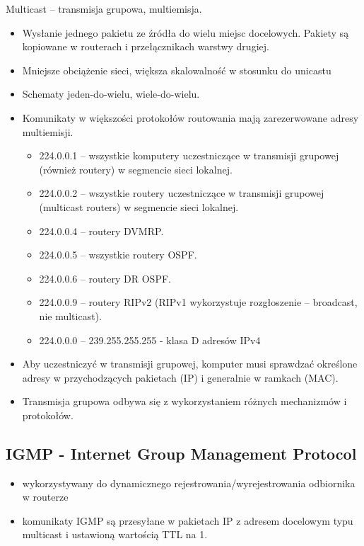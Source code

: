 \documentclass[../main.tex]{subfiles}
\begin{document}
    Multicast – transmisja grupowa, multiemisja.
    \begin{itemize}
        \item Wysłanie jednego pakietu ze źródła do wielu miejsc docelowych. Pakiety są kopiowane
        w routerach i przełącznikach warstwy drugiej.
        \item Mniejsze obciążenie
        sieci, większa skalowalność w stosunku do unicastu
        \item Schematy jeden-do-wielu, wiele-do-wielu.
        \item Komunikaty w większości protokołów routowania mają zarezerwowane adresy multiemisji.
        \begin{itemize}
            \item 224.0.0.1 – wszystkie komputery uczestniczące w transmisji grupowej (również routery) w
            segmencie sieci lokalnej.
            \item 224.0.0.2 – wszystkie routery uczestniczące w transmisji grupowej (multicast routers) w
            segmencie sieci lokalnej.
            \item 224.0.0.4 – routery DVMRP.
            \item 224.0.0.5 – wszystkie routery OSPF.
            \item 224.0.0.6 – routery DR OSPF.
            \item 224.0.0.9 – routery RIPv2 (RIPv1 wykorzystuje rozgłoszenie – broadcast, nie multicast).
            \item 224.0.0.0 – 239.255.255.255 - klasa D adresów IPv4
        \end{itemize}
        \item Aby uczestniczyć w transmisji grupowej, komputer musi sprawdzać określone adresy w
        przychodzących pakietach (IP) i generalnie w ramkach (MAC).
        \item Transmisja grupowa odbywa się z wykorzystaniem różnych mechanizmów i protokołów.

\end{itemize}

    \subsection{IGMP - Internet Group Management Protocol}
    \begin{itemize}
        \item wykorzystywany do dynamicznego rejestrowania/wyrejestrowania
        odbiornika w routerze
        \item komunikaty IGMP są przesyłane w pakietach IP z adresem docelowym typu multicast i
        ustawioną wartością TTL na 1.
    \end{itemize}
\end{document}
